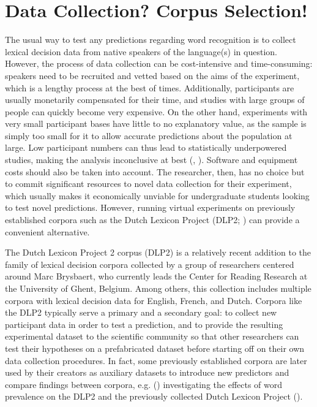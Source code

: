 \section{Data Collection? Corpus Selection!}
\label{sec:4-corpus}
The usual way to test any predictions regarding word recognition is to collect lexical decision data from native speakers of the language(s) in question. However, the process of data collection can be cost-intensive and time-consuming: speakers need to be recruited and vetted based on the aims of the experiment, which is a lengthy process at the best of times. Additionally, participants are usually monetarily compensated for their time, and studies with large groups of people can quickly become very expensive. On the other hand, experiments with very small participant bases have little to no explanatory value, as the sample is simply too small for it to allow accurate predictions about the population at large. Low participant numbers can thus lead to statistically underpowered studies, making the analysis inconclusive at best (\citeauthor{Winter+2019}, \citeyear{Winter+2019}). Software and equipment costs should also be taken into account. The researcher, then, has no choice but to commit significant resources to novel data collection for their experiment, which usually makes it economically unviable for undergraduate students looking to test novel predictions. However, running virtual experiments on previously established corpora such as the Dutch Lexicon Project (DLP2; \cite{Brysbaert+etal+2016}) can provide a convenient alternative.

The Dutch Lexicon Project 2 corpus (DLP2) is a relatively recent addition to the family of lexical decision corpora collected by a group of researchers centered around Marc Brysbaert, who currently leads the Center for Reading Research at the University of Ghent, Belgium. Among others, this collection includes multiple corpora with lexical decision data for English, French, and Dutch. Corpora like the DLP2 typically serve a primary and a secondary goal: to collect new participant data in order to test a prediction, and to provide the resulting experimental dataset to the scientific community so that other researchers can test their hypotheses on a prefabricated dataset before starting off on their own data collection procedures. In fact, some previously established corpora are later used by their creators as auxiliary datasets to introduce new predictors and compare findings between corpora, e.g. \citeauthor{Brysbaert+etal+2016} (\citeyear{Brysbaert+etal+2016}) investigating the effects of word prevalence on the DLP2 and the previously collected Dutch Lexicon Project (\cite{Keuleers+etal+2010b}). 

